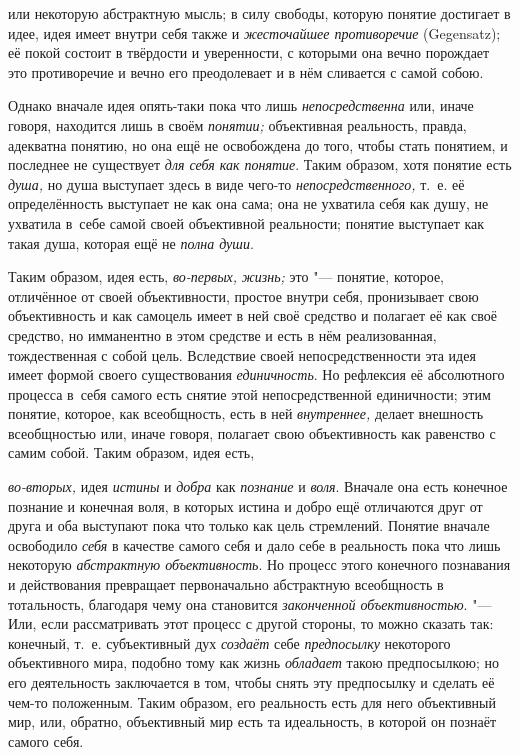 или некоторую абстрактную мысль; в силу свободы, которую
понятие достигает в идее, идея имеет внутри себя также и
{\em жесточайшее противоречие}
(Gegensatz); её покой состоит в твёрдости и уверенности, с
которыми она вечно порождает это противоречие и вечно его преодолевает и в
нём сливается с самой собою.

Однако вначале идея опять-таки пока что лишь
{\em непосредственна}
или, иначе говоря, находится лишь в своём
{\em понятии;}
объективная реальность, правда, адекватна понятию, но она ещё
не освобождена до того, чтобы стать понятием, и последнее не существует
{\em для себя как понятие}.
Таким образом, хотя понятие есть
{\em душа,} но душа
выступает здесь в виде чего-то
{\em непосредственного,}
т.~е. её определённость выступает не как она сама; она не
ухватила себя как душу, не ухватила в~себе самой своей объективной
реальности; понятие выступает как такая душа, которая ещё не
{\em полна души}.

Таким образом, идея есть,
{\em во-первых,}
{\em жизнь;} это
"--- понятие, которое, отличённое от своей объективности,
простое внутри себя, пронизывает свою объективность и как самоцель имеет в
ней своё средство и полагает её как своё средство, но имманентно в этом
средстве и есть в нём реализованная, тождественная с собой цель. Вследствие
своей непосредственности эта идея имеет формой своего существования
{\em единичность}. Но
рефлексия её абсолютного процесса в~себя самого есть снятие этой
непосредственной единичности; этим понятие, которое, как всеобщность, есть
в ней {\em внутреннее,}
делает внешность всеобщностью или, иначе говоря, полагает
свою объективность как равенство с самим собой. Таким образом, идея есть,

{\em во-вторых,} идея
{\em истины} и
{\em добра} как
{\em познание} и
{\em воля}. Вначале она
есть конечное познание и конечная воля, в которых истина и добро ещё
отличаются друг от друга и оба выступают пока что только как цель
стремлений. Понятие вначале освободило
{\em себя} в качестве
самого себя и дало себе в реальность пока что лишь некоторую
{\em абстрактную объективность}.
Но процесс этого конечного познавания и действования
превращает первоначально абстрактную всеобщность в тотальность, благодаря
чему она становится {\em законченной
объективностью}. "--- Или, если рассматривать этот процесс с
другой стороны, то можно сказать так: конечный, т.~е. субъективный дух
{\em создаёт} себе
{\em предпосылку}
некоторого объективного мира, подобно тому как жизнь
{\em обладает} такою
предпосылкою; но его деятельность заключается в том, чтобы
снять эту предпосылку и сделать её чем-то положенным. Таким образом, его
реальность есть для него объективный мир, или, обратно, объективный мир
есть та идеальность, в которой он познаёт самого себя.

